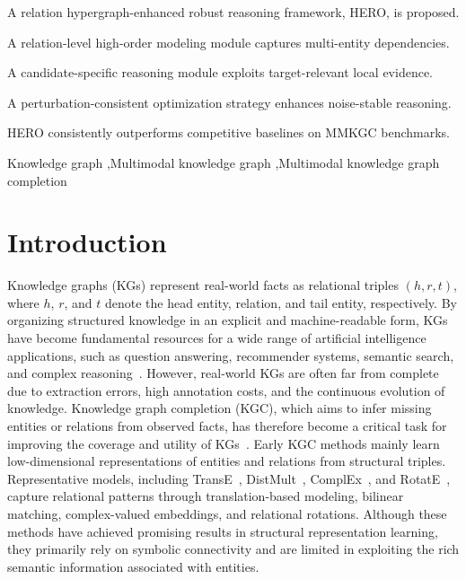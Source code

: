\documentclass[a4paper,fleqn]{cas-sc}
\begin{document}

\begin{highlights}
    \item A relation hypergraph-enhanced robust reasoning framework, HERO, is proposed.
    \item A relation-level high-order modeling module captures multi-entity dependencies.
    \item A candidate-specific reasoning module exploits target-relevant local evidence.
    \item A perturbation-consistent optimization strategy enhances noise-stable reasoning.
    \item HERO consistently outperforms competitive baselines on MMKGC benchmarks.
\end{highlights}


\begin{keywords}
Knowledge graph \sep Multimodal knowledge graph \sep Multimodal knowledge graph completion
\end{keywords}

\maketitle


\section{Introduction}

Knowledge graphs (KGs) represent real-world facts as relational triples $(h,r,t)$, where $h$, $r$, and $t$ denote the head entity, relation, and tail entity, respectively. By organizing structured knowledge in an explicit and machine-readable form, KGs have become fundamental resources for a wide range of artificial intelligence applications, such as question answering, recommender systems, semantic search, and complex reasoning~\cite{JKSUC_KG,JKSUC_KG2}. However, real-world KGs are often far from complete due to extraction errors, high annotation costs, and the continuous evolution of knowledge. Knowledge graph completion (KGC), which aims to infer missing entities or relations from observed facts, has therefore become a critical task for improving the coverage and utility of KGs~\cite{JKSUC_KGC}. Early KGC methods mainly learn low-dimensional representations of entities and relations from structural triples. Representative models, including TransE~\cite{bordes2013transe}, DistMult~\cite{yang2015distmult}, ComplEx~\cite{trouillon2016complex}, and RotatE~\cite{sun2019rotate}, capture relational patterns through translation-based modeling, bilinear matching, complex-valued embeddings, and relational rotations. Although these methods have achieved promising results in structural representation learning, they primarily rely on symbolic connectivity and are limited in exploiting the rich semantic information associated with entities.
\end{document}
